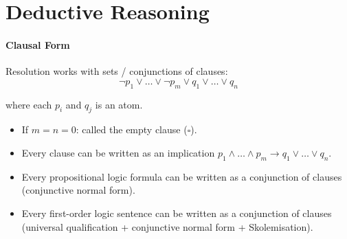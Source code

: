 \documentclass[twocolumn,english]{article}
\begin{document}
\section{Deductive Reasoning}

\paragraph{Clausal Form}

Resolution works with sets / conjunctions of clauses: 
\[
\lnot p_{1}\lor\dots\lor\lnot p_{m}\lor q_{1}\lor\dots\lor q_{n}
\]

where each $p_{i}$ and $q_{j}$ is an atom. 
\begin{itemize}
\item If $m=n=0$: called the empty clause ($\square$). 
\item Every clause can be written as an implication $p_{1}\land\dots\land p_{m}\rightarrow q_{1}\lor\dots\lor q_{n}$. 
\item Every propositional logic formula can be written as a conjunction
of clauses (conjunctive normal form). 
\item Every first-order logic sentence can be written as a conjunction of
clauses (universal qualification + conjunctive normal form + Skolemisation). 
\end{itemize}
\end{document}
